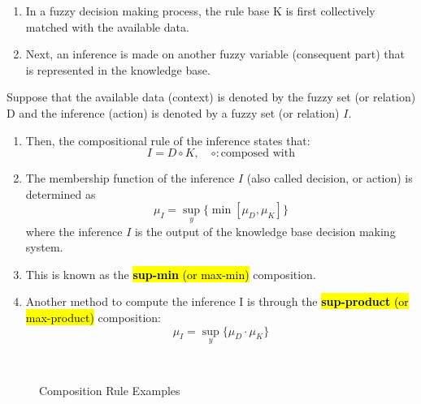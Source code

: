 \documentclass{tron}
\begin{document}
\begin{definition}{}
\begin{enumerate}
	\item In a fuzzy decision making process, the rule base K is first collectively matched with the available data.
	\item Next, an inference is made on another fuzzy variable (consequent part) that is represented in the knowledge base.
\end{enumerate}
\end{definition}

Suppose that the available data (context) is denoted by the fuzzy set (or relation) D and the inference (action) is denoted by a fuzzy set (or relation) $I$. 

\begin{enumerate}
	\item Then, the compositional rule of the inference states that:
	\begin{equation}
		I = D \circ K, \quad \circ:\text{composed with}
	\end{equation}
	\item The membership function of the inference $I$ (also called decision, or action) is determined as 
	\begin{equation}
		\mu_I = \underset{y}{\sup}\{\min [\mu_D, \mu_K]\}
	\end{equation}
	where the inference $I$ is the output of the knowledge base decision making system.
	\item This is known as the \hl{\textbf{sup-min} (or max-min)} composition.
	\item Another method to compute the inference I is through the \hl{\textbf{sup-product} (or max-product)} composition:
	\begin{equation}
		\mu_I = \underset{y}{\sup}\{\mu_D \cdot \mu_K\}
	\end{equation}
\end{enumerate}

\begin{figure}[H]
	\centering
	\\
	\caption{Composition Rule Examples}
	\label{fig:fuzzy:composition:ex3}
\end{figure}
\end{document}
